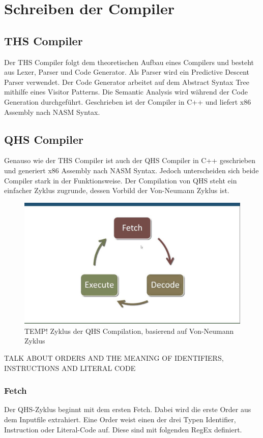 \chapter{Schreiben der Compiler}

\section{THS Compiler}
Der THS Compiler folgt dem theoretischen Aufbau eines Compilers und besteht aus Lexer, Parser und Code Generator. Als Parser wird ein Predictive Descent Parser verwendet.
Der Code Generator arbeitet auf dem Abstract Syntax Tree mithilfe eines Visitor Patterns. Die Semantic Analysis wird während der Code Generation durchgeführt. Geschrieben ist der Compiler in C++ und liefert x86 Assembly nach NASM Syntax.

\section{QHS Compiler}
Genauso wie der THS Compiler ist auch der QHS Compiler in C++ geschrieben und generiert x86 Assembly nach NASM Syntax.
Jedoch unterscheiden sich beide Compiler stark in der Funktionsweise. Der Compilation von QHS steht ein einfacher Zyklus zugrunde, dessen Vorbild der Von-Neumann Zyklus ist.

\begin{figure}[h!]
    \centering
    \includegraphics[scale=0.3]{resources/TEMP_von-neumann-cycle.jpg}
    \caption{TEMP! Zyklus der QHS Compilation, basierend auf Von-Neumann Zyklus}
    \label{fig:von-neumann-cycle}
\end{figure}

TALK ABOUT ORDERS AND THE MEANING OF IDENTIFIERS, INSTRUCTIONS AND LITERAL CODE

\subsection{Fetch} \label{sec:qhs-fetch}
Der QHS-Zyklus beginnt mit dem ersten Fetch. Dabei wird die erste Order aus dem Inputfile extrahiert. Eine Order weist einen der drei Typen Identifier, Instruction oder Literal-Code auf. Diese sind mit folgenden RegEx definiert.

